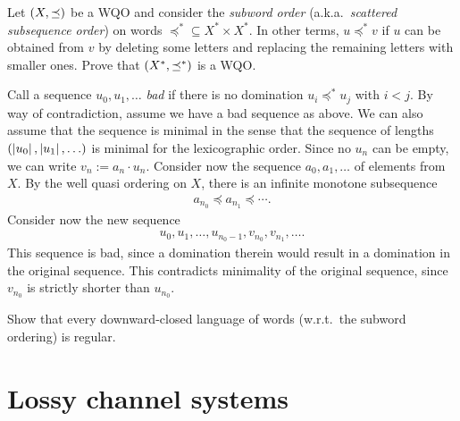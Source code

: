\begin{exercise}
    Let $\left( X, \preceq \right)$ be a WQO
    and consider the \emph{subword order} (a.k.a.~\emph{scattered subsequence order})
    on words ${\preceq^*} \subseteq X^* \times X^*$.
    In other terms, $u \preceq^* v$ if $u$ can be obtained from $v$
    by deleting some letters and replacing the remaining letters with smaller ones.
    Prove that $\left( X^*, \preceq^* \right)$ is a WQO.
\end{exercise}
\begin{solution}
    Call a sequence $u_0, u_1, \dots$ \emph{bad} if there is no domination $u_i \preceq^* u_j$ with $i < j$.
    By way of contradiction, assume we have a bad sequence as above.
    We can also assume that the sequence is minimal
    in the sense that the sequence of lengths $\tuple{\card {u_0}, \card {u_1}, \dots}$
    is minimal for the lexicographic order.
    Since no $u_n$ can be empty, we can write $v_n := a_n \cdot u_n$.
    Consider now the sequence $a_0, a_1, \dots$ of elements from $X$.
    By the well quasi ordering on $X$, there is an infinite monotone subsequence
    \begin{align*}
        a_{n_0} \preceq a_{n_1} \preceq \cdots.
    \end{align*}
    Consider now the new sequence
    \begin{align*}
        u_0, u_1, \dots, u_{n_0 - 1}, v_{n_0}, v_{n_1}, \dots.
    \end{align*}
    This sequence is bad, since a domination therein would result in a domination in the original sequence.
    This contradicts minimality of the original sequence,
    since $v_{n_0}$ is strictly shorter than $u_{n_0}$.
\end{solution}

\begin{exercise}
	Show that every downward-closed language of words (w.r.t.~the subword ordering) is regular.
\end{exercise}


\section*{Lossy channel systems}

